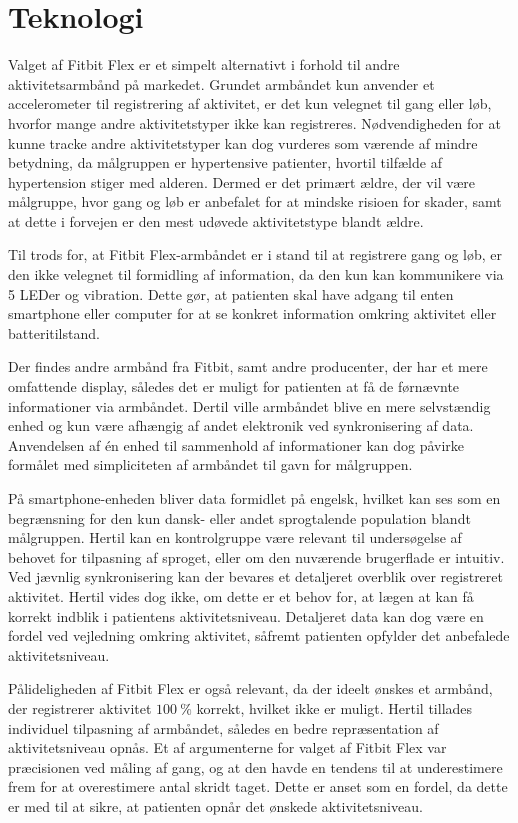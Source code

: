 \section{Teknologi} \label{sec:dis_teknologi}
Valget af Fitbit Flex er et simpelt alternativt i forhold til andre aktivitetsarmbånd på markedet. 
Grundet armbåndet kun anvender et accelerometer til registrering af aktivitet, er det kun velegnet til gang eller løb, hvorfor mange andre aktivitetstyper ikke kan registreres. 
Nødvendigheden for at kunne tracke andre aktivitetstyper kan dog vurderes som værende af mindre betydning, da målgruppen er hypertensive patienter, hvortil tilfælde af hypertension stiger med alderen. 
Dermed er det primært ældre, der vil være målgruppe, hvor gang og løb er anbefalet for at mindske risioen for skader, samt at dette i forvejen er den mest udøvede aktivitetstype blandt ældre. 

Til trods for, at Fitbit Flex-armbåndet er i stand til at registrere gang og løb, er den ikke velegnet til formidling af information, da den kun kan kommunikere via 5 LEDer og vibration. 
Dette gør, at patienten skal have adgang til enten smartphone eller computer for at se konkret information omkring aktivitet eller batteritilstand. 

Der findes andre armbånd fra Fitbit, samt andre producenter, der har et mere omfattende display, således det er muligt for patienten at få de førnævnte informationer via armbåndet. 
Dertil ville armbåndet blive en mere selvstændig enhed og kun være afhængig af andet elektronik ved synkronisering af data. Anvendelsen af én enhed til sammenhold af informationer kan dog påvirke formålet med simpliciteten af armbåndet til gavn for målgruppen. 

På smartphone-enheden bliver data formidlet på engelsk, hvilket kan ses som en begrænsning for den kun dansk- eller andet sprogtalende population blandt målgruppen. Hertil kan en kontrolgruppe være relevant til undersøgelse af behovet for tilpasning af sproget, eller om den nuværende brugerflade er intuitiv. 
Ved jævnlig synkronisering kan der bevares et detaljeret overblik over registreret aktivitet. 
Hertil vides dog ikke, om dette er et behov for, at lægen at kan få korrekt indblik i patientens aktivitetsniveau. Detaljeret data kan dog være en fordel ved vejledning omkring aktivitet, såfremt patienten opfylder det anbefalede aktivitetsniveau. 

Pålideligheden af Fitbit Flex er også relevant, da der ideelt ønskes et armbånd, der registrerer aktivitet $100~\%$ korrekt, hvilket ikke er muligt. Hertil tillades individuel tilpasning af armbåndet, således en bedre repræsentation af aktivitetsniveau opnås. 
Et af argumenterne for valget af Fitbit Flex var præcisionen ved måling af gang, og at den havde en tendens til at underestimere frem for at overestimere antal skridt taget. Dette er anset som en fordel, da dette er med til at sikre, at patienten opnår det ønskede aktivitetsniveau.